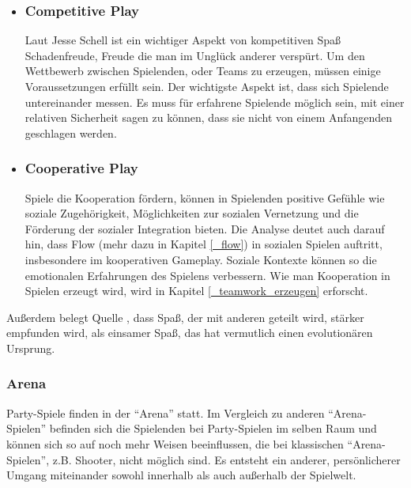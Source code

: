\begin{itemize}
\item\subsubsection{Competitive Play}
Laut Jesse Schell ist ein wichtiger Aspekt von kompetitiven Spaß Schadenfreude, Freude die man im Unglück anderer verspürt\cite[S. 196]{_art_of_gamedesign}.
Um den Wettbewerb zwischen Spielenden, oder Teams zu erzeugen, müssen einige Voraussetzungen erfüllt sein. Der wichtigste Aspekt ist, dass sich Spielende untereinander messen. Es muss für erfahrene Spielende möglich sein, mit einer relativen Sicherheit sagen zu können, dass sie nicht von einem Anfangenden geschlagen werden\Cite[S. 311]{_art_of_gamedesign}.

\item\subsubsection{Cooperative Play\label{_cooperative_play}}
Spiele die Kooperation fördern, können in Spielenden positive Gefühle wie soziale Zugehörigkeit, Möglichkeiten zur sozialen Vernetzung und die Förderung der sozialer Integration bieten\cite{_putting_the_fun_factor_into_gaming}. Die Analyse deutet auch darauf hin, dass Flow (mehr dazu in Kapitel \ref{_flow}) in sozialen Spielen auftritt, insbesondere im kooperativen Gameplay\cite{_putting_the_fun_factor_into_gaming}. Soziale Kontexte können so die emotionalen Erfahrungen des Spielens verbessern. Wie man Kooperation in Spielen erzeugt wird, wird in Kapitel \ref{_teamwork_erzeugen} erforscht.
\end{itemize}

Außerdem belegt Quelle \cite{_fun_is_more_fun}, dass Spaß, der mit anderen geteilt wird, stärker empfunden wird, als einsamer Spaß, das hat vermutlich einen evolutionären Ursprung.

\subsubsection{Arena}
Party-Spiele finden in der "`Arena"' statt\cite[S. 65]{_art_of_gamedesign}. Im Vergleich zu anderen "`Arena-Spielen"' befinden sich die Spielenden bei Party-Spielen im selben Raum und können sich so auf noch mehr Weisen beeinflussen, die bei klassischen "`Arena-Spielen"', z.B. Shooter, nicht möglich sind. Es entsteht ein anderer, persönlicherer Umgang miteinander sowohl innerhalb als auch außerhalb der Spielwelt.

